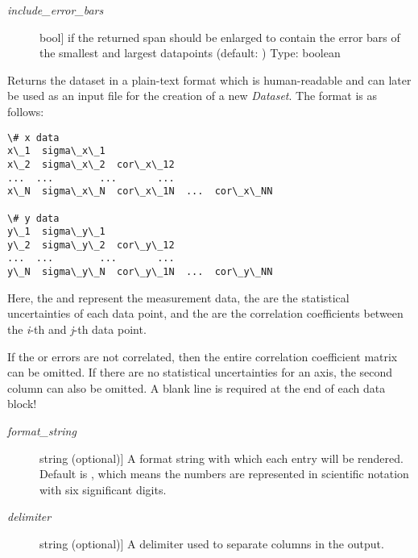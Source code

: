 \documentclass[letterpaper,10pt,english]{sphinxmanual}
\begin{document}
\begin{fulllineitems}
\begin{fulllineitems}
\begin{description}
\item[{\emph{include\_error\_bars}}] \leavevmode{[}bool{]}
 if the returned span should be enlarged to
contain the error bars of the smallest and largest datapoints (default: ) Type: boolean

\end{description}

\end{fulllineitems}


\begin{fulllineitems}
\label{api/kafe:kafe.dataset.Dataset.get_formatted}
Returns the dataset in a plain-text format which is human-readable and
can later be used as an input file for the creation of a new \emph{Dataset}.
\label{api/kafe:get-formatted}
The format is as follows:

\begin{Verbatim}[commandchars=\\\{\}]
\# x data
x\_1  sigma\_x\_1  
x\_2  sigma\_x\_2  cor\_x\_12
...  ...        ...       ...
x\_N  sigma\_x\_N  cor\_x\_1N  ...  cor\_x\_NN

\# y data
y\_1  sigma\_y\_1  
y\_2  sigma\_y\_2  cor\_y\_12
...  ...        ...       ...
y\_N  sigma\_y\_N  cor\_y\_1N  ...  cor\_y\_NN
\end{Verbatim}

Here, the  and  represent the measurement data, the  are the
statistical uncertainties of each data point, and the  are the correlation
coefficients between the \emph{i}-th and \emph{j}-th data point.

If the  or  errors are not correlated, then the entire correlation coefficient matrix
can be omitted. If there are no statistical uncertainties for an axis, the second
column can also be omitted. A blank line is required at the end of each data block!
\begin{description}
\item[{\emph{format\_string}}] \leavevmode{[}string (optional){]}
A format string with which each entry will be rendered. Default is , which means
the numbers are represented in scientific notation with six significant digits.

\item[{\emph{delimiter}}] \leavevmode{[}string (optional){]}
A delimiter used to separate columns in the output.


\end{description}
\end{fulllineitems}
\end{fulllineitems}
\end{document}
